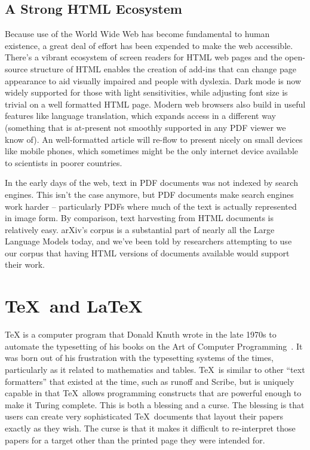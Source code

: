 \documentclass{easychair}
\begin{document}
\subsection{A Strong HTML Ecosystem}
\label{sect:A strong HTML ecosystem}

Because use of the World Wide Web has become fundamental to human existence, a great deal of effort has been expended to make the web accessible. There’s a vibrant ecosystem of screen readers for HTML web pages and the open-source structure of HTML enables the creation of add-ins that can change page appearance to aid visually impaired and people with dyslexia. Dark mode is now widely supported for those with light sensitivities, while adjusting font size is trivial on a well formatted HTML page. Modern web browsers also build in useful features like language translation, which expands access in a different way (something that is at-present not smoothly supported in any PDF viewer we know of). An well-formatted article will re-flow to present nicely on small devices like mobile phones, which sometimes might be the only internet device available to scientists in poorer countries.

In the early days of the web, text in PDF documents was not indexed by search engines. This isn't the case anymore, but PDF documents make search engines work harder -- particularly PDFs where much of the text is actually represented in image form. By comparison, text harvesting from HTML documents is relatively easy. arXiv’s corpus is a substantial part of nearly all the Large Language Models today, and we've been told by researchers attempting to use our corpus that having HTML versions of documents available would support their work.

\section{\TeX\ and \LaTeX}
\label{sect:TeX and LaTeX}

TeX is a computer program that Donald Knuth wrote in the late 1970s to automate the typesetting of his books on the Art of Computer Programming~\cite{ieee2018tex-history1,ieee2019tex-history2}. It was born out of his frustration with the typesetting systems of the times, particularly as it related to mathematics and tables. \TeX\ is similar to other ``text formatters'' that existed at the time, such as runoff and Scribe, but is uniquely capable in that \TeX\ allows programming constructs that are powerful enough to make it Turing complete. This is both a blessing and a curse. The blessing is that users can create very sophisticated \TeX\ documents that layout their papers exactly as they wish. The curse is that it makes it difficult to re-interpret those papers for a target other than the printed page they were intended for.
\end{document}
